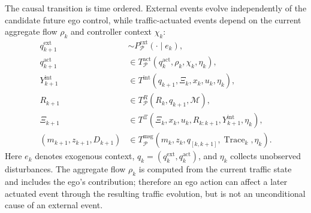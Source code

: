 \documentclass[letterpaper]{article} %
\begin{document}
The causal transition is time ordered. External events evolve independently
of the candidate future ego control, while traffic-actuated events depend on
the current aggregate flow $\rho_k$ and controller context $\chi_k$:
\begin{align}
 q_{k+1}^{\mathrm{ext}}&\sim
 P_{\mathcal P}^{\mathrm{ext}}(\cdot\mid e_k),\nonumber\\
 q_{k+1}^{\mathrm{act}}&\in
 T_{\mathcal P}^{\mathrm{act}}(q_k^{\mathrm{act}},\rho_k,\chi_k,\eta_k),\nonumber\\
 Y_{k+1}^{\mathrm{int}}&\in
 T^{\mathrm{int}}(q_{k+1},\Xi_k,x_k,u_k,\eta_k),\nonumber\\
 R_{k+1}&\in T_{\mathcal P}^{R}(R_k,q_{k+1},\mathcal M),\nonumber\\
 \Xi_{k+1}&\in T^{\Xi}(\Xi_k,x_k,u_k,R_{k:k+1},Y_{k+1}^{\mathrm{int}},\eta_k),\nonumber\\
 (m_{k+1},z_{k+1},D_{k+1})&\in
 T_{\mathcal P}^{\mathrm{msg}}(m_k,z_k,q_{[k,k+1]},\operatorname{Trace}_k,\eta_k).
 \label{eq:causal-transition}
\end{align}
Here $e_k$ denotes exogenous context, $q_k=(q_k^{\mathrm{ext}},q_k^{\mathrm{act}})$,
and $\eta_k$ collects unobserved disturbances. The aggregate flow $\rho_k$
is computed from the current traffic state and includes the ego's contribution;
therefore an ego action can affect a later actuated event through the resulting
traffic evolution, but is not an unconditional cause of an external event.
\end{document}
